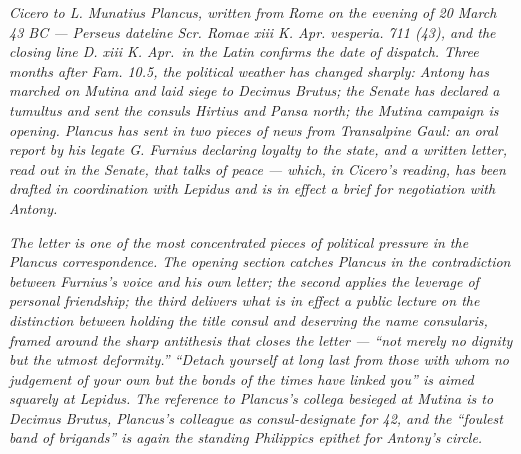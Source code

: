 
\textit{Cicero to L. Munatius Plancus, written from Rome
on the evening of 20 March 43 BC --- Perseus dateline
\textit{Scr. Romae xiii K. Apr. vesperia. 711 (43)}, and
the closing line \textit{D. xiii K. Apr.}\ in the Latin
confirms the date of dispatch. Three months after Fam.
10.5, the political weather has changed sharply: Antony
has marched on Mutina and laid siege to Decimus Brutus;
the Senate has declared a \textit{tumultus} and sent the
consuls Hirtius and Pansa north; the Mutina campaign
is opening. Plancus has sent in two pieces of news from
Transalpine Gaul: an oral report by his legate
G. Furnius declaring loyalty to the state, and a written
letter, read out in the Senate, that talks of peace ---
which, in Cicero's reading, has been drafted in
coordination with Lepidus and is in effect a brief for
negotiation with Antony.}

\textit{The letter is one of the most concentrated pieces
of political pressure in the Plancus correspondence. The
opening section catches Plancus in the contradiction
between Furnius's voice and his own letter; the second
applies the leverage of personal friendship; the third
delivers what is in effect a public lecture on the
distinction between holding the title \textit{consul} and
deserving the name \textit{consularis}, framed around the
sharp antithesis that closes the letter --- ``not merely
no dignity but the utmost deformity.'' ``Detach yourself
at long last from those with whom no judgement of your
own but the bonds of the times have linked you'' is aimed
squarely at Lepidus. The reference to Plancus's
\textit{collega} besieged at Mutina is to Decimus Brutus,
Plancus's colleague as consul-designate for 42, and the
``foulest band of brigands'' is again the standing
\textit{Philippics} epithet for Antony's circle.}
